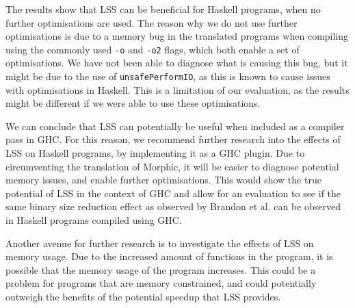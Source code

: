\documentclass[a4paper,UKenglish,cleveref, autoref, thm-restate]{template/lipics-v2021}
\newcommand{\lss}{LSS\xspace}
\newcommand{\ghc}{GHC\xspace}
\begin{document}
The results show that \lss can be beneficial for Haskell programs, when no further optimisations are used. The reason why we do not use further optimisations is due to a memory bug in the translated programs when compiling using the commonly used \verb|-o| and \verb|-o2| flags, which both enable a set of optimisations. We have not been able to diagnose what is causing this bug, but it might be due to the use of \verb|unsafePerformIO|, as this is known to cause issues with optimisations in Haskell. This is a limitation of our evaluation, as the results might be different if we were able to use these optimisations.

We can conclude that \lss can potentially be useful when included as a compiler pass in \ghc. For this reason, we recommend further research into the effects of \lss on Haskell programs, by implementing it as a \ghc plugin. Due to circumventing the translation of Morphic, it will be easier to diagnose potential memory issues, and enable further optimisations. This would show the true potential of \lss in the context of \ghc and allow for an evaluation to see if the same binary size reduction effect as observed by Brandon et al. \cite{brandon2023better} can be observed in Haskell programs compiled using \ghc.

Another avenue for further research is to investigate the effects of \lss on memory usage. Due to the increased amount of functions in the program, it is possible that the memory usage of the program increases. This could be a problem for programs that are memory constrained, and could potentially outweigh the benefits of the potential speedup that \lss provides.
\end{document}
